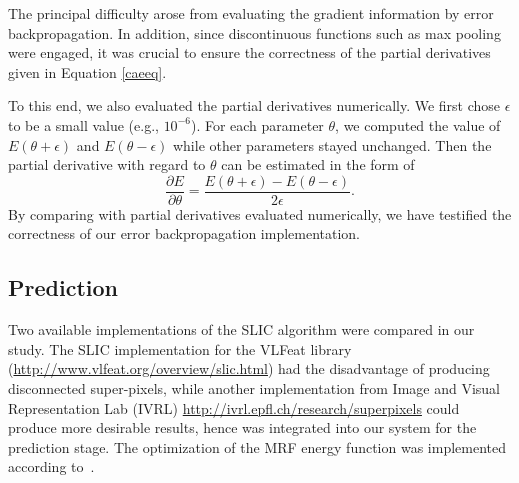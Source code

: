 The principal difficulty arose from evaluating the gradient information by error backpropagation. In addition, since discontinuous functions such as max pooling were engaged, it was crucial to ensure the correctness of the partial derivatives given in Equation \ref{caeeq}. 

To this end, we also evaluated the partial derivatives numerically. We first chose $\epsilon$ to be a small value (e.g., $10^{-6}$). For each parameter $\theta$, we computed the value of $E(\theta + \epsilon)$ and $E(\theta - \epsilon)$ while other parameters stayed unchanged. Then the partial derivative with regard to $\theta$ can be estimated in the form of 
\begin{equation}
	\frac{\partial E}{\partial \theta} = \frac{E(\theta + \epsilon)-E(\theta - \epsilon)}{2\epsilon}.
\end{equation}
By comparing with partial derivatives evaluated numerically, we have testified the correctness of our error backpropagation implementation.

\subsection{Prediction}
Two available implementations of the SLIC algorithm were compared in our study. The SLIC implementation for the VLFeat library (\url{http://www.vlfeat.org/overview/slic.html}) had the disadvantage of producing disconnected super-pixels, while another implementation from Image and Visual Representation Lab (IVRL) \url{http://ivrl.epfl.ch/research/superpixels} could produce more desirable results, hence was integrated into our system for the prediction stage. The optimization of the MRF energy function was implemented according to~\cite{kittler1984contextual}. 

